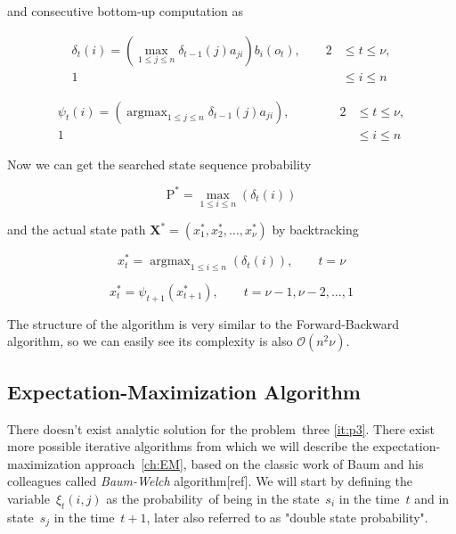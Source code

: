 \documentclass[thesis=M,english]{FITthesis}[2012/10/20]
\newcommand{\matr}[1]{\mathbf{#1}}
\newcommand{\argmax}{\mathop{\mathrm{argmax}}}
\begin{document}
and consecutive bottom-up computation as

\begin{equation}
\begin{aligned}
\delta_{t}(i) = ( \max_{ 1 \leq j \leq n } \delta_{t-1}(j)a_{ji} ) b_i(o_{t}), \qquad 2& \leq t \leq \nu, \\
																					   1& \leq i \leq n
\end{aligned}
\end{equation}

\begin{equation}
\begin{aligned}
\psi_{t}(i) = ( \argmax_{ 1 \leq j \leq n } \delta_{t-1}(j)a_{ji} ), \qquad \qquad 2& \leq t \leq \nu, \\
																			       1& \leq i \leq n
\end{aligned}
\end{equation}

Now we can get the searched state sequence probability 

\begin{equation}
\mathrm{P}^* = \max_{1 \leq i \leq n} ( \delta_{t}(i) )  
\end{equation}

and the actual state path $\matr{X}^* = ( x_1^*, x_2^*, \dots, x_{\nu}^*)$ by backtracking

\begin{equation}
x_t^* = \argmax_{1 \leq i \leq n} ( \delta_{t}(i) ),  \qquad t = \nu 
\end{equation}

\begin{equation}
x_t^* = \psi_{t+1}(x_{t+1}^*), \qquad t = \nu-1, \nu-2, \dots, 1  
\end{equation}

The structure of the algorithm is very similar to the Forward-Backward algorithm, so we can easily see its complexity is also $\mathcal{O}(n^2\nu)$.

\subsection{Expectation-Maximization Algorithm}\label{sec:BWA}

There doesn't exist analytic solution for the problem~three \ref{it:p3}. There exist more possible iterative algorithms from which we will describe the expectation-maximization approach~\ref{ch:EM}, based on the classic work of Baum and his colleagues called \textit{Baum-Welch} algorithm[ref]. We will start by defining the variable~$\xi_t(i,j)$ as the probability~of being in the state~$s_i$ in the time~$t$ and in state~$s_j$ in the time~$t+1$, later also referred to as "double state probability". 
\end{document}
